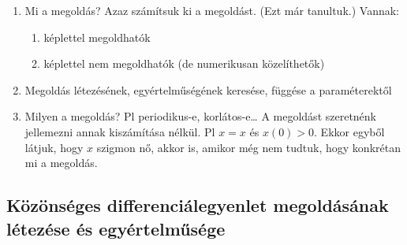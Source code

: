 \documentclass[12pt,a4paper]{scrartcl}
\providecommand{\tightlist}{%
  \setlength{\itemsep}{0pt}\setlength{\parskip}{0pt}}
\begin{document}
\begin{enumerate}
\def\labelenumi{\arabic{enumi}.}
\tightlist
\item
  Mi a megoldás? Azaz számítsuk ki a megoldást. (Ezt már tanultuk.)
  Vannak:

  \begin{enumerate}
  \def\labelenumii{\alph{enumii}.}
  \tightlist
  \item
    képlettel megoldhatók
  \item
    képlettel nem megoldhatók (de numerikusan közelíthetők)
  \end{enumerate}
\item
  Megoldás létezésének, egyértelműségének keresése, függése a
  paraméterektől
\item
  Milyen a megoldás? Pl periodikus-e, korlátos-e\ldots{} A megoldást
  szeretnénk jellemezni annak kiszámítása nélkül. Pl
  \(\overset{}{x} = x\) és \(x\left( 0 \right) > 0\). Ekkor egyből
  látjuk, hogy \(x\) szigmon nő, akkor is, amikor még nem tudtuk, hogy
  konkrétan mi a megoldás.
\end{enumerate}

\hypertarget{kozonseges-differencialegyenlet-megoldasanak-letezese-es-egyertelmusege}{%
\subsection{Közönséges differenciálegyenlet megoldásának létezése és
egyértelműsége}\label{kozonseges-differencialegyenlet-megoldasanak-letezese-es-egyertelmusege}}
\end{document}
